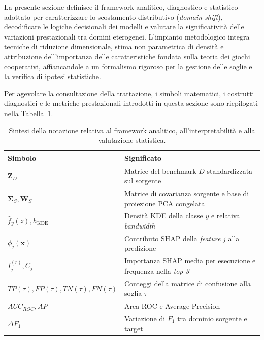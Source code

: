 La presente sezione definisce il framework analitico, diagnostico e statistico adottato per caratterizzare lo scostamento distributivo (\textit{domain shift}), decodificare le logiche decisionali dei modelli e valutare la significatività delle variazioni prestazionali tra domini eterogenei. 
L'impianto metodologico integra tecniche di riduzione dimensionale, stima non parametrica di densità e attribuzione dell'importanza delle caratteristiche fondata sulla teoria dei giochi cooperativi, affiancandole a un formalismo rigoroso per la gestione delle soglie e la verifica di ipotesi statistiche.

Per agevolare la consultazione della trattazione, i simboli matematici, i costrutti diagnostici e le metriche prestazionali introdotti in questa sezione sono riepilogati nella Tabella~\ref{tab:notazione_framework}.

\begin{table}[H]
    \centering
    \small
    \caption{Sintesi della notazione relativa al framework analitico, all'interpretabilità e alla valutazione statistica.}
    \label{tab:notazione_framework}
    \begin{tabularx}{\textwidth}{
        l
        >{\raggedright\arraybackslash}X
    }
        \toprule
        \textbf{Simbolo} & \textbf{Significato} \\
        \midrule

        $\mathbf{Z}_D$ &
        Matrice del benchmark $D$ standardizzata sul sorgente \\

        $\boldsymbol{\Sigma}_S, \mathbf{W}_S$ &
        Matrice di covarianza sorgente e base di proiezione PCA congelata \\

        $\hat{f}_y(z), h_{\text{KDE}}$ &
        Densità KDE della classe $y$ e relativa \textit{bandwidth} \\

        $\phi_j(\mathbf{x})$ &
        Contributo SHAP della \textit{feature} $j$ alla predizione \\

        $I_j^{(r)}, C_j$ &
        Importanza SHAP media per esecuzione e frequenza nella \textit{top-3} \\

        $TP(\tau), FP(\tau), TN(\tau), FN(\tau)$ &
        Conteggi della matrice di confusione alla soglia $\tau$ \\

        $AUC_{ROC}, AP$ &
        Area ROC e Average Precision \\

        $\Delta F_1$ &
        Variazione di $F_1$ tra dominio sorgente e target \\

        \bottomrule
    \end{tabularx}
\end{table}

